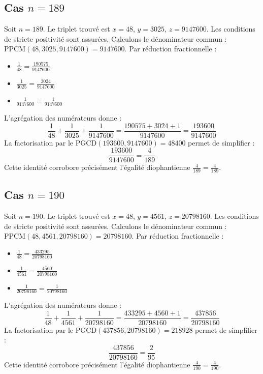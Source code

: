 \documentclass[11pt,a4paper]{article}
\begin{document}
\subsection{Cas $n = 189$}
Soit $n = 189$. Le triplet trouvé est $x = 48$, $y = 3025$, $z = 9147600$.
Les conditions de stricte positivité sont assurées.
Calculons le dénominateur commun : $\text{PPCM}(48, 3025, 9147600) = 9147600$.
Par réduction fractionnelle :
\begin{itemize}
    \item $\frac{1}{48} = \frac{190575}{9147600}$
    \item $\frac{1}{3025} = \frac{3024}{9147600}$
    \item $\frac{1}{9147600} = \frac{1}{9147600}$
\end{itemize}
L'agrégation des numérateurs donne :
$$ \frac{1}{48} + \frac{1}{3025} + \frac{1}{9147600} = \frac{190575 + 3024 + 1}{9147600} = \frac{193600}{9147600} $$
La factorisation par le $\text{PGCD}(193600, 9147600) = 48400$ permet de simplifier :
$$ \frac{193600}{9147600} = \frac{4}{189} $$
Cette identité corrobore précisément l'égalité diophantienne $\frac{4}{189} = \frac{4}{189}$.

\subsection{Cas $n = 190$}
Soit $n = 190$. Le triplet trouvé est $x = 48$, $y = 4561$, $z = 20798160$.
Les conditions de stricte positivité sont assurées.
Calculons le dénominateur commun : $\text{PPCM}(48, 4561, 20798160) = 20798160$.
Par réduction fractionnelle :
\begin{itemize}
    \item $\frac{1}{48} = \frac{433295}{20798160}$
    \item $\frac{1}{4561} = \frac{4560}{20798160}$
    \item $\frac{1}{20798160} = \frac{1}{20798160}$
\end{itemize}
L'agrégation des numérateurs donne :
$$ \frac{1}{48} + \frac{1}{4561} + \frac{1}{20798160} = \frac{433295 + 4560 + 1}{20798160} = \frac{437856}{20798160} $$
La factorisation par le $\text{PGCD}(437856, 20798160) = 218928$ permet de simplifier :
$$ \frac{437856}{20798160} = \frac{2}{95} $$
Cette identité corrobore précisément l'égalité diophantienne $\frac{4}{190} = \frac{4}{190}$.
\end{document}
